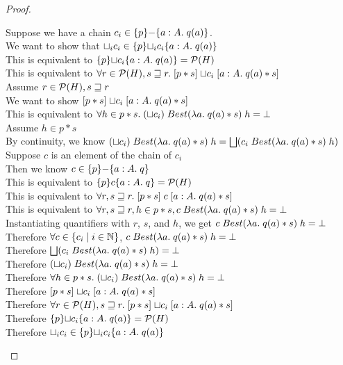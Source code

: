 \begin{proof}
\begin{tabbedproof}
\oo Suppose we have a chain $c_i \in \{{p}\}{-}\{{a:A}.\;{q(a)}\}$. \\
\ooo We want to show that $\sqcup_i c_i \in \{{p}\}{\sqcup_i c_i}\{{a:A}.\;{q(a)}\}$ \\
\ooo This is equivalent to $\{{p}\}{\sqcup c_i}\{{a:A}.\;{q(a)}\} = \mathcal{P}(H)$ \\
\ooo This is equivalent to 
     $\forall r \in \mathcal{P}(H), s \sqsupseteq r.\; 
         [{p * s}]\;{\sqcup c_i}\;[{a:A}.\;{q(a) * s}]$ \\
\ooo Assume $r \in \mathcal{P}(H), s \sqsupseteq r$ \\
\oooo We want to show $[{p * s}]\;{\sqcup c_i}\;[{a:A}.\;{q(a) * s}]$ \\
\oooo This is equivalent to $\forall h \in p * s.\; (\sqcup c_i)\; Best(\lambda a.\;q(a)*s)\;h = \bot$ \\
\oooo Assume $h \in p * s$ \\ 
\ooooo By continuity, we know $(\sqcup c_i)\; Best(\lambda a.\;q(a)*s)\;h = 
                               \bigsqcup (c_i\;Best(\lambda a.\;q(a)*s)\;h)$ \\
\ooooo Suppose $c$ is an element of the chain of $c_i$ \\
\oooooo Then we know $c \in \{{p}\}{-}\{{a:A}.\;{q}\}$ \\
\oooooo This is equivalent to $\{{p}\}{c}\{{a:A}.\;{q}\} = \mathcal{P}(H)$ \\
\oooooo This is equivalent to $\forall r, s \sqsupseteq r.\; [{p*s}]\;{c}\;[{a:A}.\;{q(a)*s}]$ \\
\oooooo This is equivalent to $\forall r, s \sqsupseteq r, h \in p*s, c\;Best(\lambda a.\;q(a)*s)\;h = \bot$ \\
\oooooo Instantiating quantifiers with $r$, $s$, and $h$, we get $c\;Best(\lambda a.\;q(a)*s)\;h = \bot$\\
\ooooo Therefore $\forall c \in \{{{c_i}\;|\;{i \in \mathbb{N}}}\}$, $c\;Best(\lambda a.\;q(a)*s)\;h = \bot$ \\
\ooooo Therefore $\bigsqcup (c_i\;Best(\lambda a.\;q(a)*s)\;h) = \bot$ \\
\ooooo Therefore $(\sqcup c_i)\;Best(\lambda a.\;q(a)*s)\;h = \bot$ \\
\oooo Therefore $\forall h \in p * s.\; (\sqcup c_i)\; Best(\lambda a.\;q(a)*s)\;h = \bot$ \\
\oooo Therefore $[{p * s}]\;{\sqcup c_i}\;[{a:A}.\;{q(a) * s}]$ \\
\ooo Therefore $\forall r \in \mathcal{P}(H), s \sqsupseteq r.\; 
                   [{p * s}]\;{\sqcup c_i}\;[{a:A}.\;{q(a) * s}]$ \\
\ooo Therefore $\{{p}\}{\sqcup c_i}\{{a:A}.\;{q(a)}\} = \mathcal{P}(H)$ \\
\ooo Therefore $\sqcup_i c_i \in \{{p}\}{\sqcup_i c_i}\{{a:A}.\;{q(a)}\}$ \\
\end{tabbedproof}
\end{proof}


